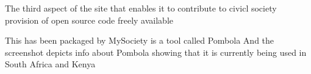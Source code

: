The third aspect of the site that enables it to contribute to civicl society 
provision of open source code freely available 

This has been packaged by MySociety is a tool called Pombola
And the screenshot depicts info about Pombola showing that it is currently being used in South Africa and Kenya